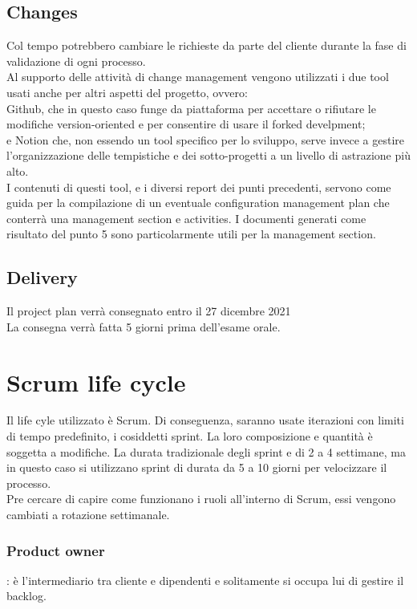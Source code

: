 \documentclass{article}
\begin{document}
\subsection{Changes}
Col tempo potrebbero cambiare le richieste da parte del cliente durante la fase di validazione di ogni processo.
\\Al supporto delle attività di change management vengono utilizzati i due tool usati anche per altri aspetti del progetto, ovvero: 
\\Github, che in questo caso funge da piattaforma per accettare o rifiutare le modifiche version-oriented e per consentire di usare il forked develpment; 
\\e Notion che, non essendo un tool specifico per lo sviluppo, serve invece a gestire l’organizzazione delle tempistiche e dei sotto-progetti a un livello di astrazione più alto.
\\I contenuti di questi tool, e i diversi report dei punti precedenti, servono come guida per la compilazione di un eventuale configuration management plan che conterrà una management section e activities. I documenti generati come risultato del punto 5 sono particolarmente utili per la management section.

\subsection{Delivery}
Il project plan verrà consegnato entro il 27 dicembre 2021
\\La consegna verrà fatta 5 giorni prima dell'esame orale.
\newpage
\section{Scrum life cycle}
Il life cyle utilizzato è Scrum. Di conseguenza, saranno usate iterazioni con limiti di tempo predefinito, i cosiddetti sprint. La loro composizione e quantità è soggetta a modifiche.
La durata tradizionale degli sprint e di 2 a 4 settimane, ma in questo caso si utilizzano sprint di durata da 5 a 10 giorni per velocizzare il processo.
\\Pre cercare di capire come funzionano i ruoli all'interno di Scrum, essi vengono cambiati a rotazione settimanale.

\subsubsection{Product owner}: è l'intermediario tra cliente e dipendenti e solitamente si occupa lui di gestire il backlog.
\end{document}

